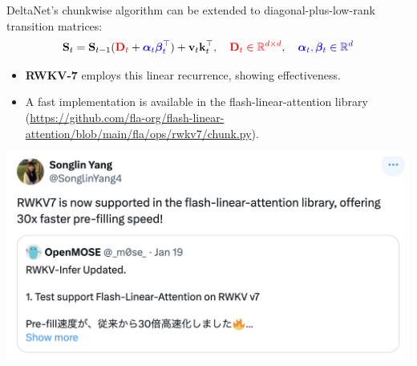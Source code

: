 \begin{frame}
    DeltaNet's chunkwise algorithm can be extended to {\color{red}diagonal}-plus-{\color{blue}low-rank} transition matrices:
    \begin{align*}
        \mathbf{S}_t = \mathbf{S}_{t-1} ({\color{red}\mathbf{D}_t} + {\color{blue}\boldsymbol{\alpha}_t \boldsymbol{\beta}_t^\top}) + \mathbf{v}_t \mathbf{k}_t^\top, \quad {\color{red}\mathbf{D}_t \in \mathbb{R}^{d \times d}}, \quad {\color{blue}\boldsymbol{\alpha}_t, \boldsymbol{\beta}_t \in \mathbb{R}^{d}}
    \end{align*}
    \vspace{-5mm}
    \begin{itemize}
        \item \textbf{RWKV-7} employs this linear recurrence, showing effectiveness. 
        \item A fast implementation is available in the flash-linear-attention library (\url{https://github.com/fla-org/flash-linear-attention/blob/main/fla/ops/rwkv7/chunk.py}).
    \end{itemize}
    
    \begin{center}
        \includegraphics[width=0.75\linewidth]{figure/rwkv7.png}
    \end{center}
\end{frame}

